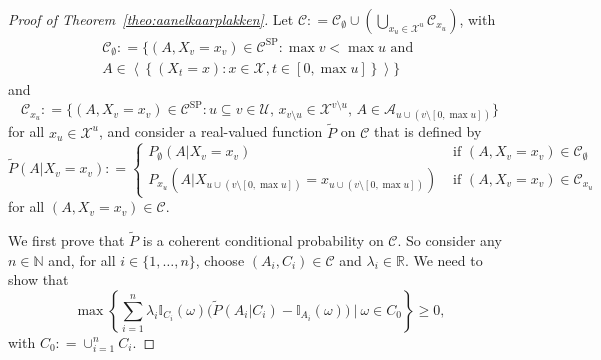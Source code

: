 \documentclass[10pt,a4paper]{paper}
\theoremstyle{definition}
\newcommand{\nats}{\mathbb{N}}
\newcommand{\reals}{\mathbb{R}}
\newcommand{\states}{\mathcal{X}}
\newcommand{\ind}[1]{\mathbb{I}_{#1}}
\newcommand{\coloneqq}{:\!=}
\begin{document}
\begin{proof}[Proof of Theorem~\ref{theo:aanelkaarplakken}]
Let $\mathcal{C}\coloneqq\mathcal{C}_\emptyset\cup(\bigcup_{x_u\in\states^u}\mathcal{C}_{x_u})$, with
\begin{multline}\label{eq:theo:aanelkaarplakken:firstpartofdomain}
\mathcal{C}_\emptyset\coloneqq
\{(A,X_v=x_v)\in\mathcal{C}^{\mathrm{SP}}\colon \max v<\max u\text{~and~}\\A\in\left\langle
\left\{
(X_t=x)
\colon
x\in\states,t\in[0,\max u]
\right\}
\right\rangle\}
\end{multline}
and
\begin{equation}\label{eq:theo:aanelkaarplakken:secondpartofdomain}
\mathcal{C}_{x_u}\coloneqq\{
(A,X_v=x_v)\in\mathcal{C}^\mathrm{SP}
\colon
u\subseteq v\in\mathcal{U},\,
x_{v\setminus u}\in\states^{v\setminus u},\,
 A\in\mathcal{A}_{u\cup(v\setminus[0,\max u])}
\}
\end{equation}
for all $x_u\in\states^u$, and consider a real-valued function $\tilde{P}$ on $\mathcal{C}$ that is defined by 
\begin{equation}\label{eq:theo:aanelkaarplakken:defPtilde}
\tilde{P}(A\vert X_v=x_v)
\coloneqq
\begin{cases}
P_\emptyset(A\vert X_v=x_v)&\text{~if $(A,X_v=x_v)\in\mathcal{C}_\emptyset$}\\
P_{x_u}(A\vert 
X_{u\cup(v\setminus[0,\max u])}=x_{u\cup(v\setminus[0,\max u])})&\text{~if $(A,X_v=x_v)\in\mathcal{C}_{x_u}$}
\end{cases}
\end{equation}
for all $(A,X_v=x_v)\in\mathcal{C}$.

We first prove that $\tilde{P}$ is a coherent conditional probability on $\mathcal{C}$. So consider any $n\in\nats$ and, for all $i\in\{1,\dots,n\}$, choose $(A_i,C_i)\in\mathcal{C}$ and $\lambda_i\in\reals$. We need to show that
\begin{equation}\label{eq:theo:aanelkaarplakken:coh}
\max\left\{\sum_{i=1}^n\lambda_i\ind{C_i}(\omega)\bigl(\tilde{P}(A_i\vert C_i)-\ind{A_i}(\omega)\bigr)~\Bigg\vert~\omega\in C_0\right\}\geq0,
\end{equation}
with $C_0\coloneqq\cup_{i=1}^nC_i$.


\end{proof}
\end{document}
